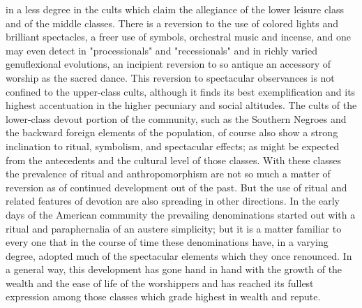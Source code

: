 \documentclass[12pt]{report}
\begin{document}
in a less degree in the cults which claim the allegiance of the lower
leisure class and of the middle classes. There is a reversion to the
use of colored lights and brilliant spectacles, a freer use of symbols,
orchestral music and incense, and one may even detect in "processionals"
and "recessionals" and in richly varied genuflexional evolutions, an
incipient reversion to so antique an accessory of worship as the sacred
dance. This reversion to spectacular observances is not confined to the
upper-class cults, although it finds its best exemplification and its
highest accentuation in the higher pecuniary and social altitudes. The
cults of the lower-class devout portion of the community, such as the
Southern Negroes and the backward foreign elements of the population,
of course also show a strong inclination to ritual, symbolism, and
spectacular effects; as might be expected from the antecedents and the
cultural level of those classes. With these classes the prevalence of
ritual and anthropomorphism are not so much a matter of reversion as of
continued development out of the past. But the use of ritual and related
features of devotion are also spreading in other directions. In the
early days of the American community the prevailing denominations
started out with a ritual and paraphernalia of an austere simplicity;
but it is a matter familiar to every one that in the course of time
these denominations have, in a varying degree, adopted much of the
spectacular elements which they once renounced. In a general way, this
development has gone hand in hand with the growth of the wealth and the
ease of life of the worshippers and has reached its fullest expression
among those classes which grade highest in wealth and repute.
\end{document}
